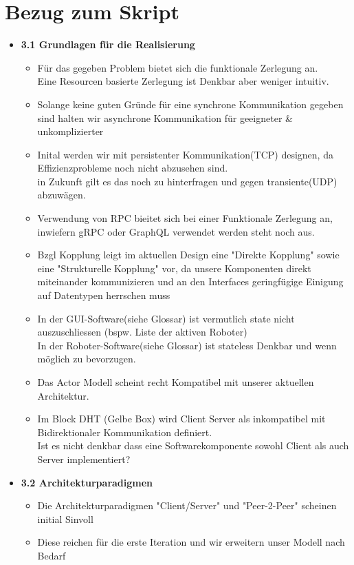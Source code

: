 \documentclass{article}
\begin{document}
\section{Bezug zum Skript}

\begin{itemize}
	\item \textbf{3.1 Grundlagen für die Realisierung}
		\begin{itemize}
			\item Für das gegeben Problem bietet sich die funktionale Zerlegung an. \\
                Eine Resourcen basierte Zerlegung ist Denkbar aber weniger intuitiv.
                \item Solange keine guten Gründe für eine synchrone Kommunikation gegeben sind halten wir asynchrone Kommunikation für geeigneter \& unkomplizierter
                \item Inital werden wir mit persistenter Kommunikation(TCP) designen, da Effizienzprobleme noch nicht abzusehen sind. \\
                in Zukunft gilt es das noch zu hinterfragen und gegen transiente(UDP) abzuwägen.
                \item Verwendung von RPC bieitet sich bei einer Funktionale Zerlegung an, inwiefern gRPC oder GraphQL verwendet werden steht noch aus.
                \item Bzgl Kopplung leigt im aktuellen Design eine "Direkte Kopplung" sowie eine "Strukturelle Kopplung" vor, da unsere Komponenten direkt miteinander kommunizieren und an den Interfaces geringfügige Einigung auf Datentypen herrschen muss
                \item In der GUI-Software(siehe Glossar) ist vermutlich state nicht auszuschliessen (bspw. Liste der aktiven Roboter) \\
                In der Roboter-Software(siehe Glossar) ist stateless Denkbar und wenn möglich zu bevorzugen.
                \item Das Actor Modell scheint recht Kompatibel mit unserer aktuellen Architektur.
                \item Im Block DHT (Gelbe Box) wird Client Server als inkompatibel mit Bidirektionaler Kommunikation definiert. \\
                Ist es nicht denkbar dass eine Softwarekomponente sowohl Client als auch Server implementiert?
		\end{itemize}
	\item \textbf{3.2 Architekturparadigmen}
		\begin{itemize}
			\item Die Architekturparadigmen "Client/Server" und "Peer-2-Peer" scheinen initial Sinvoll
                \item Diese reichen für die erste Iteration und wir erweitern unser Modell nach Bedarf
		\end{itemize}
\end{itemize}
 
\end{document}
